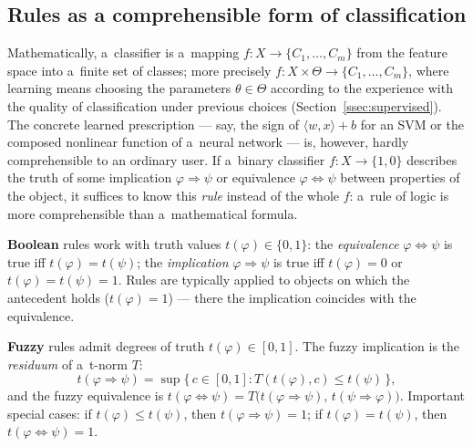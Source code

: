 \documentclass[11pt,a4paper]{article}
\theoremstyle{definition}
\begin{document}
\subsection{Rules as a comprehensible form of classification}
\label{ssec:srozumitelnost}

Mathematically, a~classifier is a~mapping $f\colon X\to\{C_1,\dots,C_m\}$ from the
feature space into a~finite set of classes; more precisely $f\colon
X\times\Theta\to\{C_1,\dots,C_m\}$, where learning means choosing the parameters
$\theta\in\Theta$ according to the experience with the quality of classification under
previous choices (Section~\ref{ssec:supervised}). The concrete learned prescription ---
say, the sign of $\langle w,x\rangle+b$ for an SVM or the composed nonlinear function of
a~neural network --- is, however, hardly comprehensible to an ordinary user. If a~binary
classifier $f\colon X\to\{1,0\}$ describes the truth of some implication
$\varphi\Rightarrow\psi$ or equivalence $\varphi\Leftrightarrow\psi$ between properties
of the object, it suffices to know this \emph{rule} instead of the whole $f$: a~rule of
logic is more comprehensible than a~mathematical formula.

\begin{defbox}
\textbf{Boolean} rules work with truth values $t(\varphi)\in\{0,1\}$: the
\emph{equivalence} $\varphi\Leftrightarrow\psi$ is true iff $t(\varphi)=t(\psi)$; the
\emph{implication} $\varphi\Rightarrow\psi$ is true iff $t(\varphi)=0$ or
$t(\varphi)=t(\psi)=1$. Rules are typically applied to objects on which the antecedent
holds ($t(\varphi)=1$) --- there the implication coincides with the equivalence.

\textbf{Fuzzy} rules admit degrees of truth $t(\varphi)\in[0,1]$. The fuzzy implication
is the \emph{residuum} of a~t-norm $T$:
\[ t(\varphi\Rightarrow\psi)=\sup\{\,c\in[0,1]: T(t(\varphi),c)\le t(\psi)\,\}, \]
and the fuzzy equivalence is $t(\varphi\Leftrightarrow\psi)
=T\big(t(\varphi\Rightarrow\psi),\,t(\psi\Rightarrow\varphi)\big)$. Important special
cases: if $t(\varphi)\le t(\psi)$, then $t(\varphi\Rightarrow\psi)=1$; if
$t(\varphi)=t(\psi)$, then $t(\varphi\Leftrightarrow\psi)=1$.
\end{defbox}
\end{document}
